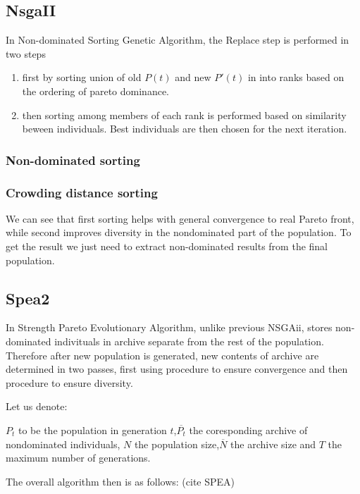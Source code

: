 \documentclass[12pt,oneside,draft]{fithesis2}
\begin{document}
\subsection{NsgaII}
In Non-dominated Sorting Genetic Algorithm, the Replace step is performed in two steps
\begin{enumerate}
\item first by sorting union of old $P(t)$ and new $P'(t)$ in into ranks based on the ordering of pareto dominance.
\item then sorting among members of each rank is performed based on similarity beween individuals. Best individuals are then chosen for the next iteration.
\end{enumerate}

\subsubsection{Non-dominated sorting}



\subsubsection{Crowding distance sorting}

We can see that first sorting helps with general convergence to real Pareto front, while second improves diversity in the nondominated part of the population. To get the result we just need to extract non-dominated results from the final population. 

\subsection{Spea2}
In Strength Pareto Evolutionary Algorithm, unlike previous NSGAii, stores non-dominated indivituals in archive separate from the rest of the population. Therefore after new population is generated, new contents of archive are determined in two passes, first using procedure to ensure convergence and then procedure to ensure diversity.

Let us denote:

$P_t$ to be the population in generation $t$,$\overline{P_t}$ the coresponding archive of nondominated individuals, $N$ the population size,$\overline N$ the archive size and $T$ the maximum number of generations.

The overall algorithm then is as follows: (cite SPEA)
\end{document}
